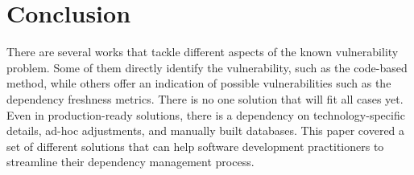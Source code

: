 \documentclass[pdf,bookmarks,colorlinks=true]{IEEEtran}
\begin{document}
\section{Conclusion}
\label{sec:Conclusion}

There are several works that tackle different aspects of the known vulnerability problem. Some of them directly identify the vulnerability, such as the code-based method, while others offer an indication of possible vulnerabilities such as the dependency freshness metrics. There is no one solution that will ﬁt all cases yet. Even in production-ready solutions, there is a dependency on technology-specific details, ad-hoc adjustments, and manually built databases. This paper covered a set of different solutions that can help software development practitioners to streamline their dependency management process.





\end{document}
